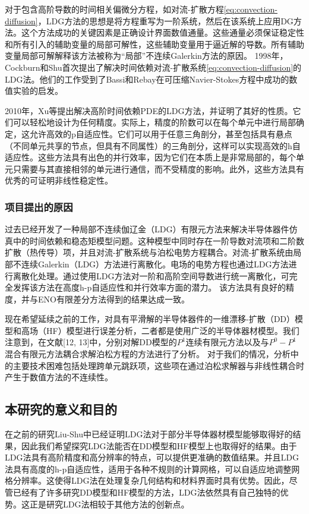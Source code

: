对于包含高阶导数的时间相关偏微分方程，如对流-扩散方程\eqref{eq:convection-diffusion}，LDG方法的思想是将方程重写为一阶系统，然后在该系统上应用DG方法。这个方法成功的关键因素是正确设计界面数值通量。这些通量必须保证稳定性和所有引入的辅助变量的局部可解性，这些辅助变量用于逼近解的导数。所有辅助变量局部可解解释该方法被称为“局部”不连续Galerkin方法的原因\cite{cockburn1998local}。
1998年，Cockburn和Shu首次提出了解决时间依赖对流-扩散系统\eqref{eq:convection-diffusion}的LDG法\cite{cockburn1998local}。他们的工作受到了Bassi和Rebay在可压缩Navier-Stokes方程中成功的数值实验的启发\cite{bassi1997high}。

2010年，Xu等提出解决高阶时间依赖PDE的LDG方法\cite{xu2010local}，并证明了其好的性质。它们可以轻松地设计为任何精度。实际上，精度的阶数可以在每个单元中进行局部确定，这允许高效的p自适应性。它们可以用于任意三角剖分，甚至包括具有悬点（不同单元共享的节点，但具有不同属性）的三角剖分，这样可以实现高效的h自适应性。这些方法具有出色的并行效率，因为它们在本质上是非常局部的，每个单元只需要与其直接相邻的单元进行通信，而不受精度的影响。此外，这些方法具有优秀的可证明非线性稳定性。

\subsubsection{项目提出的原因}
过去已经开发了一种局部不连续伽辽金（LDG）有限元方法来解决半导体器件仿真中的时间依赖和稳态矩模型问题\cite{liu2004local,liu2007locala}。这种模型中同时存在一阶导数对流项和二阶数扩散（热传导）项，并且对流-扩散系统与泊松电势方程耦合。对流-扩散系统由局部不连续Galerkin（LDG）方法进行离散化。电场的电势方程也通过LDG方法进行离散化处理。通过使用LDG方法对一阶和高阶空间导数进行统一离散化，可完全发挥该方法在高度h-p自适应性和并行效率方面的潜力。
该方法具有良好的精度\cite{liu2004local,liu2007locala}，并与ENO有限差分方法\cite{jerome1994energy}得到的结果达成一致。

现在希望延续之前的工作\cite{liu2004local,liu2007locala}，对具有平滑解的半导体器件的一维漂移-扩散（DD）模型和高场（HF）模型进行误差分析，二者都是使用广泛的半导体器材模型。我们注意到，在文献[12, 13]中，分别对解DD模型的$P^1$连续有限元方法以及与$P^0-P^1$混合有限元方法耦合求解泊松方程的方法进行了分析。
对于我们的情况，分析中的主要技术困难包括处理跨单元跳跃项，这些项在通过泊松求解器与非线性耦合时产生于数值方法的不连续性。
\subsection{本研究的意义和目的}
在之前的研究Liu-Shu中已经证明LDG法对于部分半导体器材模型能够取得好的结果，因此我们希望探究LDG法能否在DD模型和HF模型上也取得好的结果。由于LDG法具有高阶精度和高分辨率的特点，可以提供更准确的数值结果。并且LDG法具有高度的h-p自适应性，适用于各种不规则的计算网格，可以自适应地调整网格分辨率。这使得LDG法在处理复杂几何结构和材料界面时具有优势。因此，尽管已经有了许多研究DD模型和HF模型的方法，LDG法依然具有自己独特的优势。这正是研究LDG法相较于其他方法的创新点。